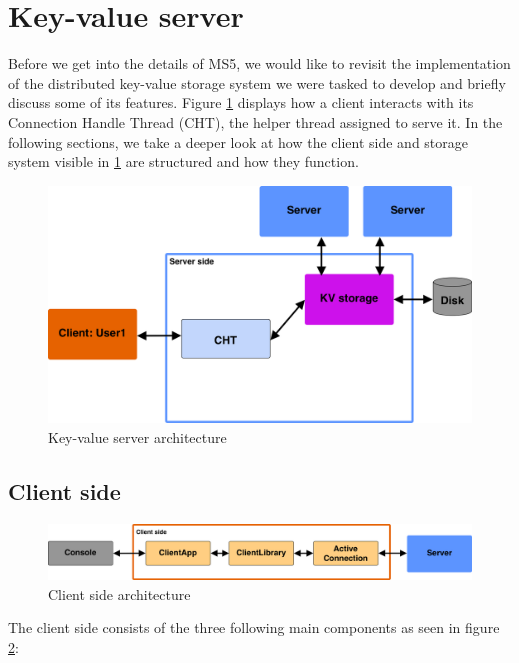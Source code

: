 \section{Key-value server}
 Before we get into the details of MS5, we would like to revisit the implementation of the distributed key-value storage system we were tasked to develop and briefly discuss some of its features. Figure \ref{fig:ms4_arch} displays how a client interacts with its Connection Handle Thread (CHT), the helper thread assigned to serve it. In the following sections, we take a deeper look at how the client side and storage system visible in \ref{fig:ms4_arch} are structured and how they function.

\begin{figure}[h]
	\centering
	\includegraphics[width=\linewidth]{figures/kvserver/ms4_structure.png}
	\caption{Key-value server architecture}
	\label{fig:ms4_arch}
\end{figure}



\subsection{Client side}

\begin{figure}[h]
	\centering
	\includegraphics[width=\linewidth]{figures/kvserver/client_arch.png}
	\caption{Client side architecture}
	\label{fig:client_arch}
\end{figure}

The client side consists of the three following main components as seen in figure \ref{fig:client_arch}:

